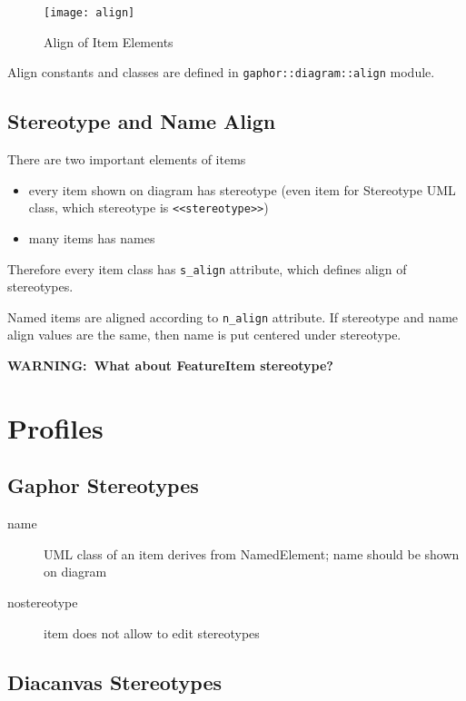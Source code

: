 \documentclass{article}
\newcommand{\module}[1]{\texttt{#1}}
\newcommand{\attr}[1]{\texttt{#1}}
\newcommand{\stereotype}[1]{\texttt{<<#1>>}}
\newcommand{\warning}[1]{\textbf{WARNING:~#1}}
\begin{document}
\begin{figure}
\begin{center}
\texttt{[image: align]}
\end{center}
\caption{Align of Item Elements}\label{items:align}
\end{figure}

Align constants and classes are defined in \module{gaphor::diagram::align} module.

\subsection{Stereotype and Name Align}

There are two important elements of items
\begin{itemize}
\item every item shown on diagram has stereotype (even item for Stereotype
    UML class, which stereotype is \stereotype{stereotype})
\item many items has names
\end{itemize}

Therefore every item class has \attr{s\_align} attribute, which defines
align of stereotypes.

Named items are aligned according to \attr{n\_align} attribute. If
stereotype and name align values are the same, then name is put
centered under stereotype.

\warning{What about FeatureItem stereotype?}

\section{Profiles}

\subsection{Gaphor Stereotypes}

\begin{description}
\item[name] UML class of an item derives from NamedElement; name
        should be shown on diagram
\item[nostereotype] item does not allow to edit stereotypes
\end{description}

\subsection{Diacanvas Stereotypes}
\end{document}
